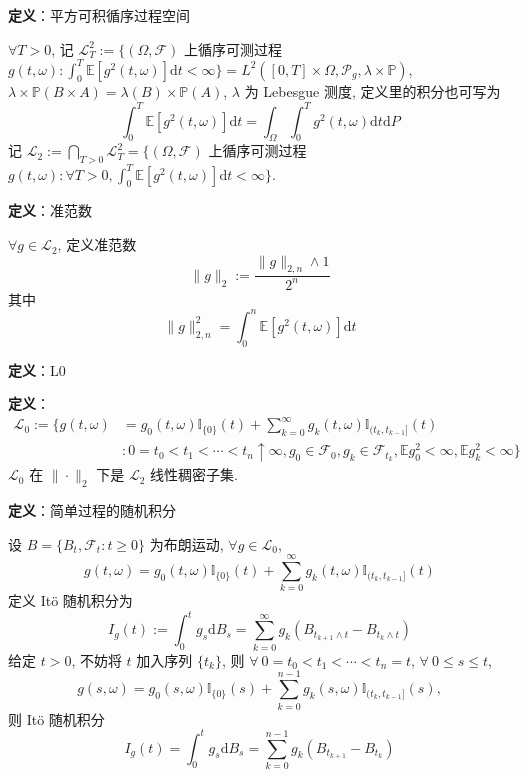 \documentclass[openany]{ctexbook}
\theoremstyle{kaiti}
\theoremstyle{normal}
\begin{document}
\textbf{定义}：平方可积循序过程空间

$\forall T>0$, 记 $\mathcal{L}_T^2:=\bigg\{(\Omega,\mathcal{F})$ 上循序可测过程 $g(t,\omega): \displaystyle\int_0^T\mathbb{E}[g^2(t,\omega)]\mathrm{d}t<\infty\bigg\}=L^2([0,T]\times\Omega,\mathcal{P}_g,\lambda\times \mathbb{P})$, $\lambda\times \mathbb{P}(B\times A)=\lambda(B)\times \mathbb{P}(A)$, $\lambda$ 为 Lebesgue 测度, 定义里的积分也可写为
\begin{equation}
  \int_0^T\mathbb{E}[g^2(t,\omega)]\mathrm{d}t=\int_\Omega\int_0^Tg^2(t,\omega)\mathrm{d}t\mathrm{d}P
\end{equation}
记 $\mathcal{L}_2:=\bigcap\limits_{T>0}\mathcal{L}_T^2=\bigg\{(\Omega,\mathcal{F})$ 上循序可测过程 $g(t,\omega): \forall T>0, \displaystyle\int_0^T\mathbb{E}[g^2(t,\omega)]\mathrm{d}t<\infty\bigg\}$.

\textbf{定义}：准范数

$\forall g\in\mathcal{L}_2$, 定义准范数
\begin{equation}
  \|g\|_2:=\frac{\|g\|_{2,n}\wedge1}{2^n}
\end{equation}
其中
\begin{equation}
  \|g\|_{2,n}^2=\int_0^n\mathbb{E}[g^2(t,\omega)]\mathrm{d}t
\end{equation}

\textbf{定义}：L0

\textbf{定义}：\begin{equation}\begin{aligned}\mathcal{L}_0:=\Bigg\{g(t,\omega)&=g_0(t,\omega)\mathbb{I}_{\{0\}}(t)+\sum_{k=0}^\infty g_k(t,\omega)\mathbb{I}_{(t_k,t_{k-1}]}(t)\\&:0=t_0<t_1<\cdots<t_n\uparrow\infty,g_0\in\mathcal{F}_0,g_k\in\mathcal{F}_{t_k},\mathbb{E}g_0^2<\infty,\mathbb{E}g_k^2<\infty\Bigg\}\end{aligned}\end{equation} $\mathcal{L}_0$ 在 $\|\cdot\|_2$ 下是 $\mathcal{L}_2$ 线性稠密子集.

\textbf{定义}：简单过程的随机积分

设 $B=\{B_t,\mathcal{F}_t:t\geqslant0\}$ 为布朗运动, $\forall g\in\mathcal{L}_0$,
\begin{equation}
  g(t,\omega)=g_0(t,\omega)\mathbb{I}_{\{0\}}(t)+\sum_{k=0}^\infty g_k(t,\omega)\mathbb{I}_{(t_k,t_{k-1}]}(t)
\end{equation}
定义 It\"o 随机积分为
\begin{equation}
  I_g(t):=\int_0^tg_s\mathrm{d}B_s=\sum_{k=0}^\infty g_k(B_{t_{k+1}\wedge t}-B_{t_{k}\wedge t})
\end{equation}
给定 $t>0$, 不妨将 $t$ 加入序列 $\{t_k\}$, 则 $\forall~ 0=t_0<t_1<\cdots<t_n=t$, $\forall~ 0\leqslant s\leqslant t$,
\begin{equation}
  g(s,\omega)=g_0(s,\omega)\mathbb{I}_{\{0\}}(s)+\sum_{k=0}^{n-1} g_k(s,\omega)\mathbb{I}_{(t_k,t_{k-1}]}(s),
\end{equation}
则 It\"o 随机积分
\begin{equation}
  I_g(t)=\int_0^tg_s\mathrm{d}B_s=\sum_{k=0}^{n-1}g_k(B_{t_{k+1}}-B_{t_k})
\end{equation}
\end{document}
